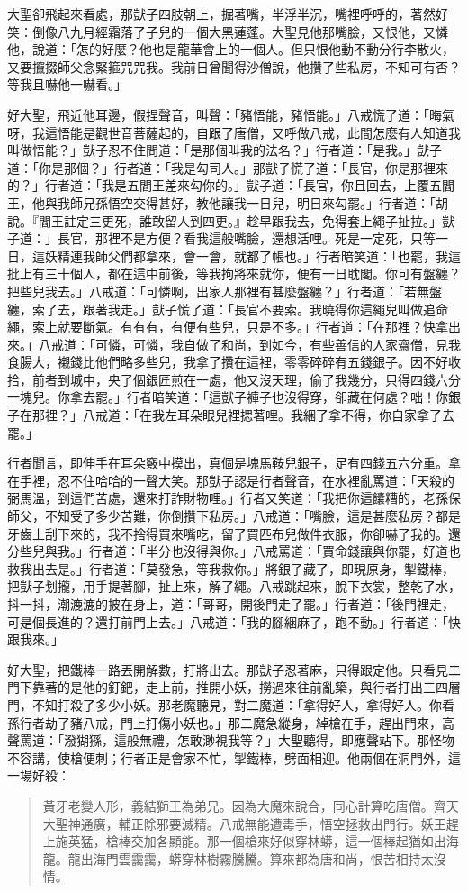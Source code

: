 大聖卻飛起來看處，那獃子四肢朝上，掘著嘴，半浮半沉，嘴裡呼呼的，著然好笑：倒像八九月經霜落了子兒的一個大黑蓮蓬。大聖見他那嘴臉，又恨他，又憐他，說道：「怎的好麼？他也是龍華會上的一個人。但只恨他動不動分行李散火，又要攛掇師父念緊箍咒咒我。我前日曾聞得沙僧說，他攢了些私房，不知可有否？等我且嚇他一嚇看。」

好大聖，飛近他耳邊，假捏聲音，叫聲：「豬悟能，豬悟能。」八戒慌了道：「晦氣呀，我這悟能是觀世音菩薩起的，自跟了唐僧，又呼做八戒，此間怎麼有人知道我叫做悟能？」獃子忍不住問道：「是那個叫我的法名？」行者道：「是我。」獃子道：「你是那個？」行者道：「我是勾司人。」那獃子慌了道：「長官，你是那裡來的？」行者道：「我是五閻王差來勾你的。」獃子道：「長官，你且回去，上覆五閻王，他與我師兄孫悟空交得甚好，教他讓我一日兒，明日來勾罷。」行者道：「胡說。『閻王註定三更死，誰敢留人到四更。』趁早跟我去，免得套上繩子扯拉。」獃子道：」長官，那裡不是方便？看我這般嘴臉，還想活哩。死是一定死，只等一日，這妖精連我師父們都拿來，會一會，就都了帳也。」行者暗笑道：「也罷，我這批上有三十個人，都在這中前後，等我拘將來就你，便有一日耽閣。你可有盤纏？把些兒我去。」八戒道：「可憐啊，出家人那裡有甚麼盤纏？」行者道：「若無盤纏，索了去，跟著我走。」獃子慌了道：「長官不要索。我曉得你這繩兒叫做追命繩，索上就要斷氣。有有有，有便有些兒，只是不多。」行者道：「在那裡？快拿出來。」八戒道：「可憐，可憐，我自做了和尚，到如今，有些善信的人家齋僧，見我食腸大，襯錢比他們略多些兒，我拿了攢在這裡，零零碎碎有五錢銀子。因不好收拾，前者到城中，央了個銀匠煎在一處，他又沒天理，偷了我幾分，只得四錢六分一塊兒。你拿去罷。」行者暗笑道：「這獃子褲子也沒得穿，卻藏在何處？咄！你銀子在那裡？」八戒道：「在我左耳朵眼兒裡揌著哩。我綑了拿不得，你自家拿了去罷。」

行者聞言，即伸手在耳朵竅中摸出，真個是塊馬鞍兒銀子，足有四錢五六分重。拿在手裡，忍不住哈哈的一聲大笑。那獃子認是行者聲音，在水裡亂罵道：「天殺的弼馬溫，到這們苦處，還來打詐財物哩。」行者又笑道：「我把你這饢糟的，老孫保師父，不知受了多少苦難，你倒攢下私房。」八戒道：「嘴臉，這是甚麼私房？都是牙齒上刮下來的，我不捨得買來嘴吃，留了買匹布兒做件衣服，你卻嚇了我的。還分些兒與我。」行者道：「半分也沒得與你。」八戒罵道：「買命錢讓與你罷，好道也救我出去是。」行者道：「莫發急，等我救你。」將銀子藏了，即現原身，掣鐵棒，把獃子划攏，用手提著腳，扯上來，解了繩。八戒跳起來，脫下衣裳，整乾了水，抖一抖，潮漉漉的披在身上，道：「哥哥，開後門走了罷。」行者道：「後門裡走，可是個長進的？還打前門上去。」八戒道：「我的腳綑麻了，跑不動。」行者道：「快跟我來。」

好大聖，把鐵棒一路丟開解數，打將出去。那獃子忍著麻，只得跟定他。只看見二門下靠著的是他的釘鈀，走上前，推開小妖，撈過來往前亂築，與行者打出三四層門，不知打殺了多少小妖。那老魔聽見，對二魔道：「拿得好人，拿得好人。你看孫行者劫了豬八戒，門上打傷小妖也。」那二魔急縱身，綽槍在手，趕出門來，高聲罵道：「潑猢猻，這般無禮，怎敢渺視我等？」大聖聽得，即應聲站下。那怪物不容講，使槍便刺；行者正是會家不忙，掣鐵棒，劈面相迎。他兩個在洞門外，這一場好殺：
\begin{quote}
黃牙老變人形，義結獅王為弟兄。因為大魔來說合，同心計算吃唐僧。齊天大聖神通廣，輔正除邪要滅精。八戒無能遭毒手，悟空拯救出門行。妖王趕上施英猛，槍棒交加各顯能。那一個槍來好似穿林蟒，這一個棒起猶如出海龍。龍出海門雲靄靄，蟒穿林樹霧騰騰。算來都為唐和尚，恨苦相持太沒情。
\end{quote}

